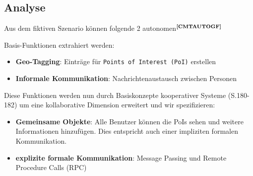 
\subsection{Analyse}\label{2_VOYAGEX}
Aus dem fiktiven Szenario können folgende 2 autonomen$^{\textbf{\ref{CMTAUTOGF}}}$%
\addtocounter{footnote}{1}%
 Basis-Funktionen
extrahiert
werden:
\enlargethispage{3\baselineskip} %
\begin{itemize}[leftmargin=*,noitemsep,topsep=1ex,parsep=0pt,partopsep=0pt]
\item \textbf{Geo-Tagging}: Einträge für \texttt{Points of Interest (PoI)} erstellen
\item \textbf{Informale Kommunikation}: Nachrichtenaustausch zwischen Personen
\end{itemize}
Diese Funktionen werden nun durch Basiskonzepte kooperativer Systeme\cite{K1678:VERTSYS} (S.180-182) um eine kollaborative Dimension erweitert und wir spezifizieren:
\begin{itemize}[leftmargin=*,noitemsep,topsep=1ex,parsep=0pt,partopsep=0pt]
\item \textbf{Gemeinsame Objekte}: Alle Benutzer können die PoIs sehen und weitere Informationen hinzufügen. Dies entspricht auch einer impliziten formalen Kommunikation.
\item \textbf{explizite formale Kommunikation}: Message Passing und Remote Procedure Calls (RPC)
\end{itemize}
